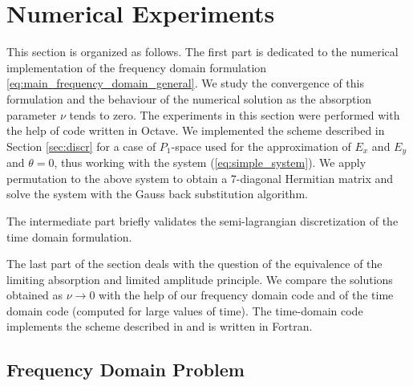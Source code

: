
\section{Numerical Experiments}
This section is organized as follows. The first part is dedicated to the numerical implementation
of the frequency domain formulation \eqref{eq:main_frequency_domain_general}. We study the convergence of this formulation and the behaviour 
of the numerical solution as the absorption parameter $\nu$ tends to zero. The experiments in this section were 
performed with the help of  code written in Octave.  
We implemented the scheme described in Section \ref{sec:discr} for a case of $P_{1}$-space used 
for the approximation of $E_{x}$ and $E_{y}$ and $\theta=0$, thus working with the system (\ref{eq:simple_system}). 
We apply permutation to the above system 
to obtain a 7-diagonal Hermitian matrix and solve the system with the Gauss back substitution algorithm. 

The intermediate part briefly validates the semi-lagrangian discretization of the time domain formulation.

The last part of the section deals with the question of the equivalence of the limiting absorption and limited amplitude 
principle. We compare the solutions obtained as $\nu\rightarrow 0$ with the help of our frequency domain code 
and of the time domain code (computed for large values of time). 
The time-domain code implements the scheme described in  and 
is written in Fortran.
 
\subsection{Frequency Domain Problem}
\label{sec:freq_dep}
